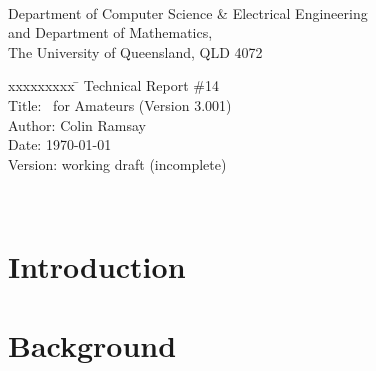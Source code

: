 \documentclass[12pt,a4paper,twoside]{repcram}
\begin{document}
\pagestyle{empty}

\begin{center}\large
{} \\[2.0ex]
Department of Computer Science {\normalsize\&} Electrical Engineering \\
and Department of Mathematics, \\
The University of Queensland, QLD 4072
\end{center}

\vspace*{3.5in}

\begin{center}\large
{\parbox{75mm}{\begin{tabbing}
xxxxxxxxx \= \kill
         \> Technical Report \#14 \\[2.25ex]
Title:   \> \ace\ for Amateurs (Version 3.001) \\[0.75ex]
Author:  \> Colin Ramsay \\
Date:    \> \today \\
Version: \> working draft (incomplete)
\end{tabbing}}}
\end{center}


\newpage
\pagestyle{plain}
\setcounter{page}{2}

\ 


\newpage

\tableofcontents

\newpage
{}
\listoffigures

\newpage
{}
\listoftables


\newpage
\setcounter{page}{1}

\chapter{Introduction}



\chapter{Background}

\end{document}
